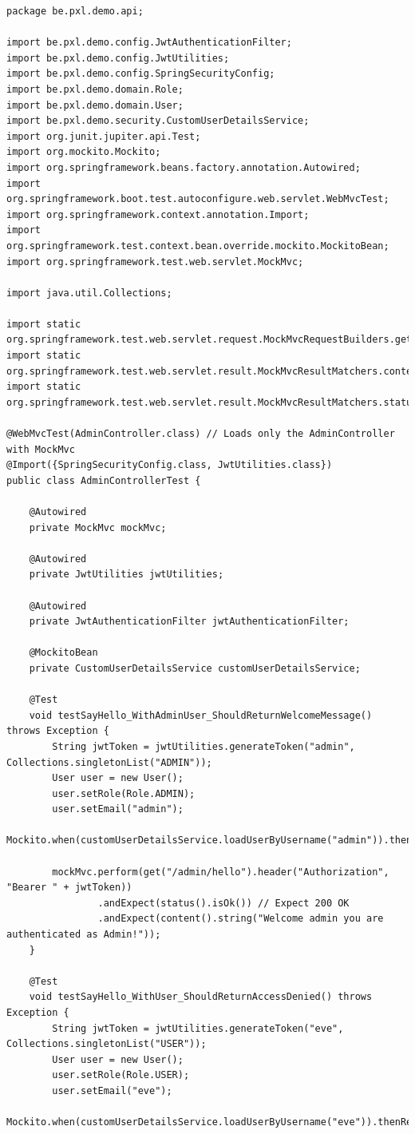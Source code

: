 \begin{lstlisting}
package be.pxl.demo.api;

import be.pxl.demo.config.JwtAuthenticationFilter;
import be.pxl.demo.config.JwtUtilities;
import be.pxl.demo.config.SpringSecurityConfig;
import be.pxl.demo.domain.Role;
import be.pxl.demo.domain.User;
import be.pxl.demo.security.CustomUserDetailsService;
import org.junit.jupiter.api.Test;
import org.mockito.Mockito;
import org.springframework.beans.factory.annotation.Autowired;
import org.springframework.boot.test.autoconfigure.web.servlet.WebMvcTest;
import org.springframework.context.annotation.Import;
import org.springframework.test.context.bean.override.mockito.MockitoBean;
import org.springframework.test.web.servlet.MockMvc;

import java.util.Collections;

import static org.springframework.test.web.servlet.request.MockMvcRequestBuilders.get;
import static org.springframework.test.web.servlet.result.MockMvcResultMatchers.content;
import static org.springframework.test.web.servlet.result.MockMvcResultMatchers.status;

@WebMvcTest(AdminController.class) // Loads only the AdminController with MockMvc
@Import({SpringSecurityConfig.class, JwtUtilities.class})
public class AdminControllerTest {

    @Autowired
    private MockMvc mockMvc;

    @Autowired
    private JwtUtilities jwtUtilities;

    @Autowired
    private JwtAuthenticationFilter jwtAuthenticationFilter;

    @MockitoBean
    private CustomUserDetailsService customUserDetailsService;

    @Test
    void testSayHello_WithAdminUser_ShouldReturnWelcomeMessage() throws Exception {
        String jwtToken = jwtUtilities.generateToken("admin", Collections.singletonList("ADMIN"));
        User user = new User();
        user.setRole(Role.ADMIN);
        user.setEmail("admin");
        Mockito.when(customUserDetailsService.loadUserByUsername("admin")).thenReturn(user);

        mockMvc.perform(get("/admin/hello").header("Authorization", "Bearer " + jwtToken))
                .andExpect(status().isOk()) // Expect 200 OK
                .andExpect(content().string("Welcome admin you are authenticated as Admin!"));
    }

    @Test
    void testSayHello_WithUser_ShouldReturnAccessDenied() throws Exception {
        String jwtToken = jwtUtilities.generateToken("eve", Collections.singletonList("USER"));
        User user = new User();
        user.setRole(Role.USER);
        user.setEmail("eve");
        Mockito.when(customUserDetailsService.loadUserByUsername("eve")).thenReturn(user);


\end{lstlisting}
